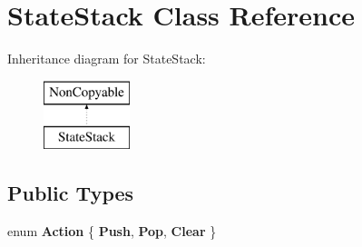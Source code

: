 \hypertarget{class_state_stack}{}\section{State\+Stack Class Reference}
\label{class_state_stack}
Inheritance diagram for State\+Stack\+:\begin{figure}[H]
\begin{center}
\leavevmode
\includegraphics[height=2.000000cm]{class_state_stack}
\end{center}
\end{figure}
\subsection*{Public Types}
\begin{DoxyCompactItemize}
\item 
\hypertarget{class_state_stack_af804142a55cd477767353e0abbcc218c}{}enum {\bfseries Action} \{ {\bfseries Push}, 
{\bfseries Pop}, 
{\bfseries Clear}
 \}\label{class_state_stack_af804142a55cd477767353e0abbcc218c}

\end{DoxyCompactItemize}
